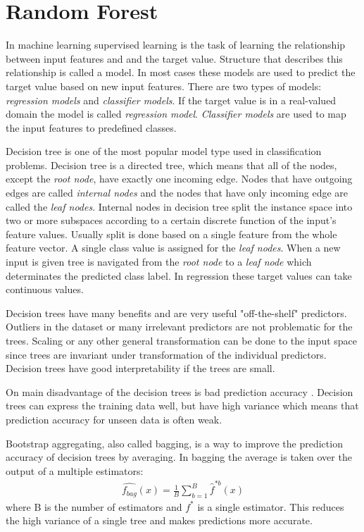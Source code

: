 \section{Random Forest}
\label{ss:randomforest}
In machine learning supervised learning is the task of learning the relationship between input features and and the target value. Structure that describes this relationship is called a model. In most cases these models are used to predict the target value based on new input features. There are two types of models: \textit{regression models} and \textit{classifier models}. If the target value is in a real-valued domain the model is called \textit{regression model}. \textit{Classifier models} are used to map the input features to predefined classes. \cite{rokach2005top}

Decision tree is one of the most popular model type used in classification problems. Decision tree is a directed tree, which means that all of the nodes, except the \textit{root node}, have exactly one incoming edge. Nodes that have outgoing edges are called \textit{internal nodes} and the nodes that have only incoming edge are called the \textit{leaf nodes}. Internal nodes in decision tree split the instance space into two or more subspaces according to a certain discrete function of the input's feature values. Usually split is done based on a single feature from the whole feature vector. A single class value is assigned for the \textit{leaf nodes}. When a new input is given tree is navigated from the \textit{root node} to a \textit{leaf node} which determinates the predicted class label. In regression these target values can take continuous values. \cite{rokach2005top}

Decision trees have many benefits and are very useful "off-the-shelf" predictors. Outliers in the dataset or many irrelevant predictors are not problematic for the trees. Scaling or any other general transformation can be done to the input space since trees are invariant under transformation of the individual predictors. \cite{friedman2001elements} Decision trees have good interpretability if the trees are small.

On main disadvantage of the decision trees is bad prediction accuracy \cite{friedman2001elements}. Decision trees can express the training data well, but have high variance which means that prediction accuracy for unseen data is often weak.

Bootstrap aggregating, also called bagging, is a way to improve the prediction accuracy of decision trees by averaging. In bagging the average is taken over the output of a multiple estimators:
\begin{align}
    \hat {f_{bag}}(x) = \frac{1}{B}\sum_{b = 1}^{B} \hat {f}^{*b}(x)
\end{align}
where B is the number of estimators and ${f}^{*}$ is a single estimator. This reduces the high variance of a single tree and makes predictions more accurate.

